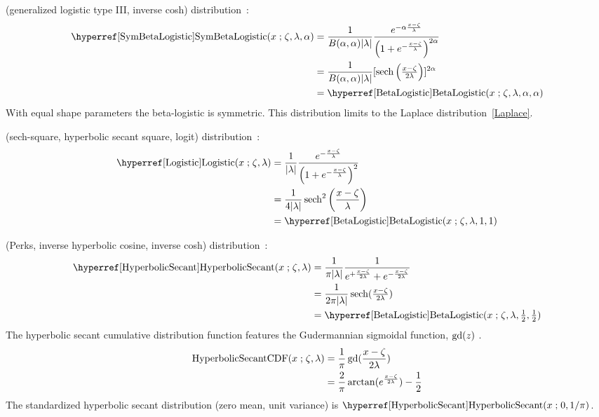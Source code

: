  (generalized logistic type III, inverse cosh) distribution~\cite{Johnson1995}:
\begin{align}
\label{SymBetaLogistic}
\opr{SymBetaLogistic}(x\given \pLoc,\pScale,\alpha) 
& =
\frac{1}{B(\alpha, \alpha) |\pScale|}
 \frac{e^{-\alpha \frac{x-\pLoc}{\pScale} }} { \left(1 + e^{-\frac{x-\pLoc}{\pScale}  }\right)^{2\alpha} } \checked
  \\ \notag & = \frac{1}{B(\alpha, \alpha) |\pScale|} [\op{sech} \left(\tfrac{x-\pLoc}{2\pScale}  \right)]^{2\alpha}  
\\ \notag & = \opr{BetaLogistic}(x\given \pLoc,\pScale,\alpha,\alpha) \checked
\end{align}
With equal shape parameters the  beta-logistic is symmetric. This distribution limits to the Laplace distribution~\eqref{Laplace}.


 (sech-square, hyperbolic secant square, logit) distribution~\cite{Verhulst1845, Balakrishnan1991, Johnson1995}:
\begin{align}
\label{Logistic}
\opr{Logistic}(x\given \pLoc,\pScale) 
& =
 \frac{1}{ \left| \pScale\right|}
 \frac{e^{-\frac{x-\pLoc}{\pScale} }} { \left(1 + e^{-\frac{x-\pLoc}{\pScale}  }\right)^{2} }	\checked
 \\ \notag & = \frac{1}{4 |\pScale|} \op{sech}^2 \left(\frac{x-\pLoc}{\pScale}  \right)  \checked
 \\ \notag & = \opr{BetaLogistic}(x\given \pLoc,\pScale,1,1)	\checked
\end{align}





 (Perks, inverse hyperbolic cosine, inverse cosh) distribution~\cite{Perks1932,Talacko1956, Johnson1995}:
\begin{align}
\label{HyperbolicSecant}
\opr{HyperbolicSecant}(x\given \pLoc, \pScale) 
& =
\frac{1}{\pi |\pScale|}
 \frac{1}{e^{+\sfrac{x-\pLoc}{2\pScale}} + e^{- \sfrac{x-\pLoc}{2\pScale} }} \checked
 \\ & = \frac{1}{2 \pi  |\pScale|} \op{sech}(\sfrac{x-\pLoc}{2\lambda}) \notag \checked
 \\ \notag & = \opr{BetaLogistic}(x\given  \pLoc, \pScale,\tfrac{1}{2},\tfrac{1}{2}) \checked
\end{align}
The hyperbolic secant cumulative distribution function features the Gudermannian sigmoidal function, $\operatorname{gd}(z)$ . 
\begin{align*}
\operatorname{HyperbolicSecantCDF}(x\mathrel{;} \zeta, \lambda)  & = \frac{1}{\pi}\operatorname{gd}(\frac{x-\zeta}{2 \lambda})  \\
& =  \frac{2}{\pi} \arctan(e^\frac{x-\zeta}{2\lambda}) - \frac{1}{2} 
\end{align*}
The standardized hyperbolic secant distribution (zero mean, unit variance) is $\opr{HyperbolicSecant}(x\given 0, 1/\pi)\checked$.

